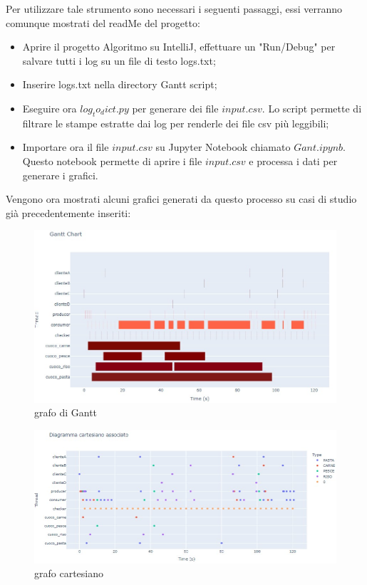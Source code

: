 Per utilizzare tale strumento sono necessari i seguenti passaggi, essi verranno comunque mostrati del readMe del progetto:
\begin{itemize}
	\item Aprire il progetto Algoritmo su IntelliJ, effettuare un "Run/Debug" per salvare tutti i log su un file di testo logs.txt;
	\item Inserire logs.txt nella directory Gantt script;
	\item Eseguire ora $log_to_dict.py$ per generare dei file $input.csv$. Lo script permette di filtrare le stampe estratte dai log per renderle dei file csv più leggibili;
	\item Importare ora il file $input.csv$ su Jupyter Notebook chiamato $Gant.ipynb$. Questo notebook permette di aprire i file $input.csv$ e processa i dati per generare i grafici.
\end{itemize}


Vengono ora mostrati alcuni grafici generati da questo processo su casi di studio già precedentemente inseriti:
\begin{figure}[htbp]
	\centering
	\includegraphics[scale=0.7]{iterazione3/images/gantt_example.jpg}
	\caption{grafo di Gantt\label{fig:Gantt_example}}
\end{figure}

\begin{figure}[htbp]
	\centering
	\includegraphics[scale=0.7]{iterazione3/images/cartesiano_example.jpg}
	\caption{grafo cartesiano\label{fig:cartesiano-example}}
\end{figure}
\newpage

